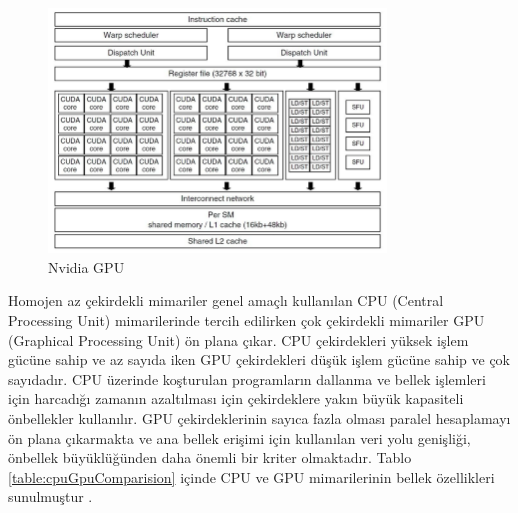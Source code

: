 
\begin{figure}
\centering
\shorthandoff{=}
\includegraphics[width=0.8\textwidth]{gorsel/nvidiagpu.jpg}
\shorthandoff{=}
\caption{Nvidia GPU}
\label{image:nvidiagpu}
\end{figure}



Homojen az çekirdekli mimariler genel amaçlı kullanılan CPU (Central Processing Unit) mimarilerinde tercih edilirken çok çekirdekli mimariler GPU (Graphical Processing Unit) ön plana çıkar. CPU çekirdekleri yüksek işlem gücüne sahip ve az sayıda iken GPU çekirdekleri düşük işlem gücüne sahip ve çok sayıdadır. CPU üzerinde koşturulan programların dallanma ve bellek işlemleri için harcadığı zamanın azaltılması için çekirdeklere yakın büyük kapasiteli önbellekler kullanılır. GPU çekirdeklerinin sayıca fazla olması paralel hesaplamayı ön plana çıkarmakta ve ana bellek erişimi için kullanılan veri yolu genişliği, önbellek büyüklüğünden daha önemli bir kriter olmaktadır. Tablo \ref{table:cpuGpuComparision} içinde CPU ve GPU mimarilerinin bellek özellikleri sunulmuştur \cite{cpuGpuMemoryTable}. \par

